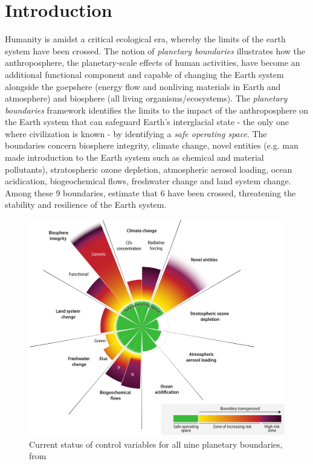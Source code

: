 \chapter*{Introduction}
\label{Introduction}

Humanity is amidst a critical ecological era, whereby the limits of the earth system have been crossed. The notion of \textit{planetary boundaries} \citep{rockstrom2009safe,steffen_2015_planetary} illustrates how the anthroposphere, the planetary-scale effects of human activities, have become an additional functional component and capable of changing the Earth system \citep{richardson_earth_2023} alongside the goepshere (energy flow and nonliving materials in Earth and atmosphere) and biosphere (all living organisms/ecosystems). The \textit{planetary boundaries} framework identifies the limits to the impact of the anthroposphere on the Earth system that can safeguard Earth's interglacial state - the only one where civilization is known - by identifying a \textit{safe operating space}. The boundaries concern biosphere integrity, climate change, novel entities (e.g. man made introduction to the Earth system such as chemical and material pollutants), stratospheric ozone depletion, atmospheric aerosol loading, ocean acidication, biogeochemical flows, freshwater change and land system change. Among these 9 boundaries, \cite{richardson_earth_2023} estimate that 6 have been crossed, threatening the stability and resilience of the Earth system. 

\begin{figure}[H]
	\centering
	\includegraphics[width= .7\textwidth]{figures/intro/planetary_bounds.jpg}
	\caption{Current status of control variables for all nine planetary boundaries, from \cite{richardson_earth_2023}}
\end{figure}

